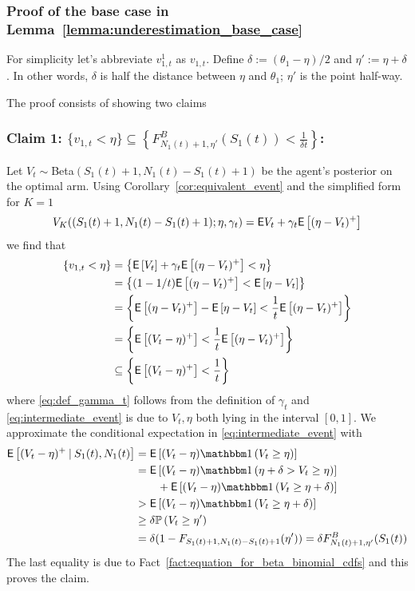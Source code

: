 \subsubsection{Proof of the base case in Lemma~\ref{lemma:underestimation_base_case}}
\begin{myproof}[Proof.]
	For simplicity let's abbreviate $v^1_{1,t}$ as $v_{1,t}$. Define $\delta := (\theta_1 - \eta)/2$ and  $\eta' :=  \eta + \delta$. In other words, $\delta$ is half the distance between $\eta$ and $\theta_1$; $\eta'$ is the point half-way.
	
	The proof consists of showing two claims
	\subsubsection*{Claim 1: $\{v_{1,t} < \eta\} \subseteq \left\{F^B_{N_1(t)+1, \eta'}(S_1(t)) < \frac{1}{\delta t}\right\}$:}
	Let $V_t \sim $Beta$(S_1(t)+1,N_1(t) - S_1(t) + 1)$ be the agent's posterior on the optimal arm. Using Corollary~\ref{cor:equivalent_event} and the simplified form for $K=1$ \[V_K((S_1(t)+1, N_1(t) - S_1(t) + 1); \eta, \gamma_t) = \mathsf{E}{V_t} + \gamma_t\mathsf{E} \left[ (\eta - V_t)^+ \right]\] we find that
	\begin{align}
	\left\{v_{1,t} < \eta \right\} & = \left\{ \mathsf{E} \left[ V_t  \right] + \gamma_t\mathsf{E} \left[ (\eta - V_t)^+ \right] < \eta \right\} \nonumber\\
	& =  \left\{ (1-1/t)\mathsf{E} \left[ (\eta - V_t)^+ \right] < \mathsf{E} \left[ \eta - V_t \right] \right\} \label{eq:def_gamma_t} \\
	& =  \left\{ \mathsf{E} \left[ (\eta - V_t)^+ \right] - \mathsf{E} \left[ \eta - V_t \right] <  \frac{1}{t}\mathsf{E} \left[ (\eta - V_t)^+ \right]\right\} \nonumber\\
	& =  \left\{ \mathsf{E} \left[ (V_t - \eta)^+ \right]<  \frac{1}{t}\mathsf{E} \left[ (\eta - V_t)^+ \right]\right\} \nonumber\\
	& \subseteq \left\{ \mathsf{E} \left[  (V_t - \eta)^+ \right]< \frac{1}{t}  \right\}  \label{eq:intermediate_event}
	\end{align}
	where \eqref{eq:def_gamma_t} follows from the definition of $\gamma_t$ and \eqref{eq:intermediate_event} is due to $V_t, \eta$ both lying in the interval $[0,1]$. We approximate the conditional expectation in \eqref{eq:intermediate_event} with
	\begin{align}
	\Ee{(V_t - \eta)^+ \given S_1(t), N_1(t)} & = \Ee{(V_t - \eta) \ind{V_t \ge \eta} }\nonumber \\
	& = \Ee{(V_t - \eta) \ind{\eta + \delta > V_t \ge \eta} }  \nonumber \\
	& \qquad + \Ee{(V_t - \eta) \ind{ V_t \ge \eta + \delta} } \nonumber \\
	& > \Ee{(V_t - \eta) \ind{ V_t \ge \eta + \delta} } \nonumber \\
	& \ge \delta\P{ V_t \ge \eta' } \nonumber \\
	& = \delta (1 - F_{S_1(t)+1,N_1(t)-S_1(t)+1}(\eta')) = \delta F^B_{N_1(t)+1,\eta'}(S_1(t)) \label{ineq:lower_bound_on_ppart_term}
	\end{align}
	The last equality is due to Fact~\ref{fact:equation_for_beta_binomial_cdfs} and this proves the claim.

\end{myproof}
